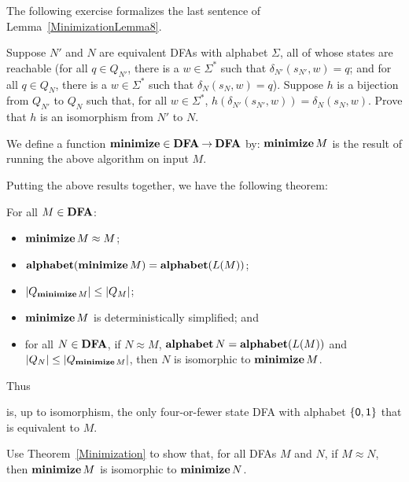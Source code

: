 The following exercise formalizes the last sentence of
Lemma~\ref{MinimizationLemma8}.

\begin{exercise}
Suppose $N'$ and $N$ are equivalent DFAs with alphabet $\Sigma$, all
of whose states are reachable (for all $q\in Q_{N'}$, there is a
$w\in\Sigma^*$ such that $\delta_{N'}(s_{N'},w) = q$; and for all
$q\in Q_{N}$, there is a $w\in\Sigma^*$ such that
$\delta_{N}(s_{N},w) = q$). Suppose $h$ is a bijection from $Q_{N'}$
to $Q_N$ such that, for all $w\in\Sigma^*$,
$h(\delta_{N'}(s_{N'},w))=\delta_N(s_N,w)$. Prove that $h$ is
an isomorphism from $N'$ to $N$.
\end{exercise}

%
We define a function $\mathbf{minimize}\in\mathbf{DFA}\mathbin{\to}\mathbf{DFA}$ by:
$\mathbf{minimize}\,M$ is the result of running the above algorithm on
input $M$.

Putting the above results together, we have the following theorem:
\begin{theorem}
\label{Minimization}
For all $M\in\mathbf{DFA}$:
\begin{itemize}
\item $\mathbf{minimize}\,M\approx M$;

\item $\mathbf{alphabet}(\mathbf{minimize}\,M)=\mathbf{alphabet}(L(M))$;

\item $|Q_{\mathbf{minimize}\,M}| \leq |Q_M|$;

\item $\mathbf{minimize}\,M$ is deterministically simplified; and

\item for all $N\in\mathbf{DFA}$, if $N\approx M$, $\mathbf{alphabet}\,N=\mathbf{alphabet}(L(M))$ and
$|Q_N|\leq|Q_{\mathbf{minimize}\,M}|$, then $N$ is isomorphic to $\mathbf{minimize}\,M$.
\end{itemize}
\end{theorem}

Thus
\begin{center}

\end{center}
is, up to isomorphism, the only four-or-fewer state DFA with alphabet
$\{\mathsf{0},\mathsf{1}\}$ that is equivalent to $M$.

\begin{exercise}
Use Theorem~\ref{Minimization} to show that, for all DFAs $M$ and $N$,
if $M\approx N$, then $\mathbf{minimize}\,M$ is isomorphic to $\mathbf{minimize}\,N$.
\end{exercise}

